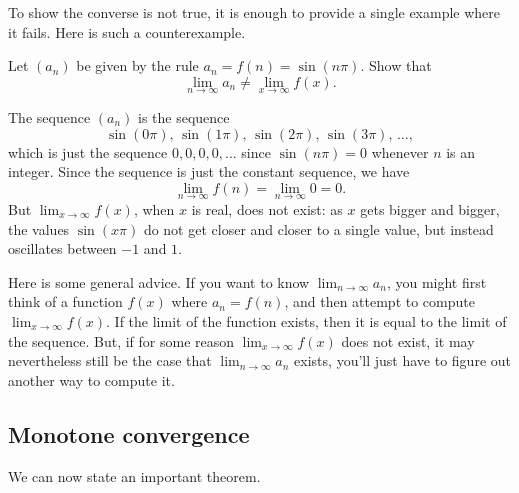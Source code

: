 \documentclass{ximera}
\begin{document}
To show the converse is not true, it is enough to provide a single
example where it fails.  Here is such a counterexample.

\begin{example}
  Let $(a_n)$ be given by the rule $a_n = f(n)=\sin(n\pi)$. Show that
  \[
  \lim_{n\to\infty} a_n \ne \lim_{x\to \infty}f(x).
  \]
  \begin{explanation}
  The sequence $(a_n)$ is the sequence
  \[
  \sin(0\pi),\, \sin(1\pi),\, \sin(2\pi),\,\sin(3\pi),\,\ldots,
  \]
which is just the sequence $0, 0, 0, 0, \ldots$ since $\sin(n\pi)=0$
whenever $n$ is an integer.  Since the sequence is just the constant
sequence, we have
\[
\lim_{n\to\infty} f(n)= \lim_{n\to\infty} 0 = 0. 
\]
But $\lim_{x\to\infty}f(x)$, when $x$ is real, does not exist: as $x$
gets bigger and bigger, the values $\sin(x\pi)$ do not get closer and
closer to a single value, but instead oscillates between $-1$ and $1$.
  \end{explanation}
\end{example}

Here is some general advice. If you want to know $\lim_{n\to\infty}
a_n$, you might first think of a function $f(x)$ where $a_n = f(n)$,
and then attempt to compute $\lim_{x\to\infty}f(x)$.  If the limit of
the function exists, then it is equal to the limit of the sequence.
But, if for some reason $\lim_{x\to\infty}f(x)$ does not exist, it may
nevertheless still be the case that $\lim_{n\to\infty}a_n$ exists,
you'll just have to figure out another way to compute it.


\subsection{Monotone convergence}

We can now state an important theorem.
\end{document}
